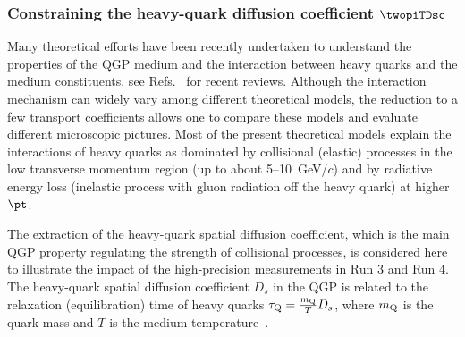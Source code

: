 \subsubsection{Constraining the heavy-quark diffusion coefficient $\twopiTDsc$}
\label{sec:HFDs}

Many theoretical efforts have been recently undertaken to understand the properties of the QGP medium and the interaction between heavy quarks and the medium constituents, see Refs.~\cite{Andronic:2015wma,Prino:2016cni,Rapp:2018qla} for recent reviews. 
Although the interaction mechanism can widely vary among different theoretical models, the reduction to a few transport coefficients allows one to compare these models and evaluate different microscopic pictures. 
Most of the present theoretical models explain the interactions of heavy quarks as dominated by collisional (elastic) processes in the low transverse momentum region (up to about 5--10~GeV/$c$) and by radiative energy loss (inelastic process with gluon radiation off the heavy quark) at higher $\pt$.

The extraction of the heavy-quark spatial diffusion coefficient, which is the main QGP property regulating the strength of collisional processes, is considered here to illustrate the impact of the high-precision measurements in Run 3 and Run 4. The heavy-quark spatial diffusion coefficient $D_s$ in the QGP is related to the relaxation (equilibration) time of heavy quarks $\tau_{\rm Q} = \frac{m_{\rm Q}}{T}D_s$, where $m_{\rm Q}$ is the quark mass and $T$ is the medium temperature~\cite{Moore:2004tg}.  




